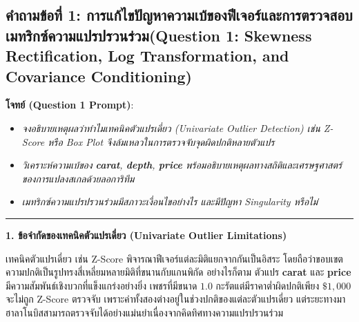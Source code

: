 \documentclass[12pt,a4paper]{article}
\newcommand{\codevar}[1]{\textcolor{codeaccent}{\textbf{#1}}}
\begin{document}
\subsection*{คำถามข้อที่ 1: การแก้ไขปัญหาความเบ้ของฟีเจอร์และการตรวจสอบเมทริกซ์ความแปรปรวนร่วม\newline \normalsize(Question 1: Skewness Rectification, Log Transformation, and Covariance Conditioning)}
\vspace{-0.5em}

\begin{ansbox}[unbreakable, fontupper={\fontsize{9.6pt}{12.6pt}\selectfont}, left=6pt, right=6pt, top=3pt, bottom=3pt]
\textbf{โจทย์ (Question 1 Prompt)}:
\begin{itemize}[leftmargin=1.2em, itemsep=0pt, topsep=0pt, parsep=0pt]
    \item[(a)] \textit{จงอธิบายเหตุผลว่าทำไมเทคนิคตัวแปรเดี่ยว (Univariate Outlier Detection) เช่น Z-Score หรือ Box Plot จึงล้มเหลวในการตรวจจับจุดผิดปกติหลายตัวแปร}
    \item[(b)] \textit{วิเคราะห์ความเบ้ของ \codevar{carat}, \codevar{depth}, \codevar{price} พร้อมอธิบายเหตุผลทางสถิติและเศรษฐศาสตร์ของการแปลงสเกลด้วยลอการิทึม}
    \item[(c)] \textit{เมทริกซ์ความแปรปรวนร่วมมีสภาวะเงื่อนไขอย่างไร และมีปัญหา Singularity หรือไม่}
\end{itemize}

\vspace{-0.2em}
\noindent\rule{\linewidth}{0.4pt}
\vspace{-0.2em}

\noindent\textbf{\normalsize 1. ข้อจำกัดของเทคนิคตัวแปรเดี่ยว (Univariate Outlier Limitations)}\par\vspace{0.05em}
เทคนิคตัวแปรเดี่ยว เช่น Z-Score พิจารณาฟีเจอร์แต่ละมิติแยกจากกันเป็นอิสระ โดยถือว่าขอบเขตความปกติเป็นรูปทรงสี่เหลี่ยมหลายมิติที่ขนานกับแกนพิกัด อย่างไรก็ตาม ตัวแปร \codevar{carat} และ \codevar{price} มีความสัมพันธ์เชิงบวกที่แข็งแกร่งอย่างยิ่ง เพชรที่มีขนาด $1.0$ กะรัตแต่มีราคาต่ำผิดปกติเพียง $\$1,000$ จะไม่ถูก Z-Score ตรวจจับ เพราะค่าทั้งสองต่างอยู่ในช่วงปกติของแต่ละตัวแปรเดี่ยว แต่ระยะทางมาฮาลาโนบิสสามารถตรวจจับได้อย่างแม่นยำเนื่องจากคิดทิศทางความแปรปรวนร่วม


\end{ansbox}
\end{document}
